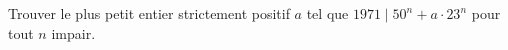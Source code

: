 Trouver le plus petit entier strictement positif $a$ tel que $1971 \mid 50^n + a \cdot 23^n$ pour tout $n$ impair.
